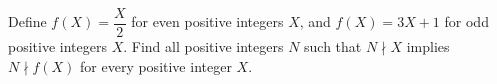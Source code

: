 Define $f(X)=\dfrac{X}{2}$ for even positive integers $X$, and $f(X)=3X+1$ for odd positive integers $X$. Find all positive integers $N$ such that $N\nmid X$ implies $N\nmid f(X)$ for every positive integer $X$.
